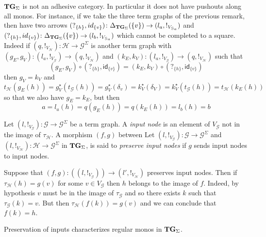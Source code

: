 \documentclass[a4paper,UKenglish,cleveref,pdftex,thm-restate,numberwithinsect]{lipics-v2021}
\newcommand{\catname}[1]{\textbf{\textup{#1}}}
\newcommand{\tg}[0]{\catname{TG}_{\Sigma}}
\newcommand{\id}[1]{\mathsf{id}_{#1}}
\begin{document}
{\begin{remark}
	$\tg$ is not an adhesive category. In particular it does not have pushouts along all monos. For instance, if we take the three term graphs of the previous remark, then have two arrows
	$(?_{\{h\}}, \id{\{v\}})\colon \Delta_{\tg}(\{v\})\to (l_a, !_{V_{\mathcal{G}_a}})$ and $(?_{\{h\}}, \id{\{v\}})\colon \Delta_{\tg}(\{v\})\to (l_b, !_{V_{\mathcal{G}_a}})$ which cannot be completed to a square. Indeed if $(q, !_{V_\mathcal{H}})\colon \mathcal{H}\to \mathcal{G}^\Sigma$ is another term graph with $(g_E, g_V)\colon (l_a, !_{V_{\mathcal{G}}})\to (q, !_{V_\mathcal{H}})$ and $(k_E, k_V)\colon (l_a, !_{V_{\mathcal{G}}})\to (q, !_{V_\mathcal{H}})$  such that 
	\[(g_E, g_V)\circ (?_{\{h\}}, \id{\{v\}}) = (k_E, k_V)\circ (?_{\{h\}}, \id{\{v\}})\]
	then $g_V=k_V$ and
	\[t_{\mathcal{H}}(g_E(h))=g^\star_V(t_{\mathcal{G}}(h))=g_V^\star(\delta_v)=k^\star_V(\delta_V)=k^\star_V(t_{\mathcal{G}}(h))=t_{\mathcal{H}}(k_E(h))\]
	so that we also have $g_E=k_E$, but then
	\[
	a=l_a(h)=q(g_E(h))=q(k_E(h))=l_b(h)=b\]
\end{remark}
}

\begin{definition}
	Let $(l, !_{V_{\mathcal{G}}})\colon \mathcal{G}\to \mathcal{G}^{\Sigma}$  be a term graph. A \emph{input node} is an element of $V_{\mathcal{G}}$ not in the image of $\tau_{\mathcal{H}}$.  A morphism $(f,g)$ between
	Let $(l, !_{V_{\mathcal{G}}})\colon \mathcal{G}\to \mathcal{G}^{\Sigma}$ and $(l, !_{V_{\mathcal{H}}})\colon \mathcal{H}\to \mathcal{G}^{\Sigma}$ in $\tg$, is said to \emph{preserve input nodes} if $g$ sends input nodes to input nodes.
\end{definition}

\begin{remark}\label{prop:image}
	Suppose that $(f,g)\colon ((l, !_{V_{\mathcal{G}}}))\to (l', !_{V_{\mathcal{H}}})$ preserves input nodes. Then  if $\tau_{\mathcal{H}}(h)=g(v)$ for some $v\in V_{\mathcal{G}}$ then $h$ belongs to the image of $f$. Indeed, by hypothesis $v$ must be in the image of $\tau_{\mathcal{G}}$ and so there exists $k$ such that $\tau_{\mathcal{G}}(k)=v$. But then $\tau_{\mathcal{H}}(f(k))=g(v)$ and we can conclude that $f(k)=h$.
\end{remark}

Preservation of inputs characterizes regular monos in $\tg$.

\end{document}
